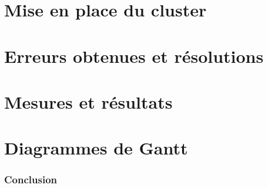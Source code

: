 \documentclass[a4paper, 11pt]{article}
\begin{document}
\part{Mise en place du cluster}


\part{Erreurs obtenues et résolutions}


\part{Mesures et résultats}


\part{Diagrammes de Gantt}

\clearpage



\newpage
\section{Conclusion}

\end{document}
